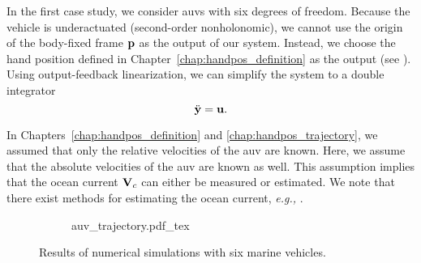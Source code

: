 In the first case study, we consider \glspl{auv} with six degrees of freedom.
Because the vehicle is underactuated (second-order nonholonomic), we cannot use the origin of the body-fixed frame $\mathbf{p}$ as the output of our system.
Instead, we choose the hand position defined in Chapter~\ref{chap:handpos_definition} as the output (see ).
Using output-feedback linearization, we can simplify the system to a double integrator 
\begin{equation}
    \ddot{\mathbf{y}} = \mathbf{u}. 
\end{equation}

\begin{rmk*}
    In Chapters~\ref{chap:handpos_definition} and \ref{chap:handpos_trajectory}, we assumed that only the relative velocities of the \gls{auv} are known.
    Here, we assume that the absolute velocities of the \gls{auv} are known as well.
    This assumption implies that the ocean current $\mathbf{V}_c$ can either be measured or estimated.
    We note that there exist methods for estimating the ocean current, \emph{e.g.,} \cite{zhu_kalman_2016}.
\end{rmk*}

\begin{figure}[t]
    \centering
    \begin{subfigure}[c]{0.9\textwidth}
        \centering
        \def\svgwidth{\textwidth}
        {auv_trajectory.pdf_tex}
        
    \end{subfigure}
    \vspace*{5mm}
    \begin{subfigure}[c]{0.9\textwidth}
        \centering        
        
        
    \end{subfigure}
    \vspace*{-8mm}
    \caption{Results of numerical simulations with six marine vehicles.}
    \label{fig:MPC_AUV_simulations}
    
\end{figure}

